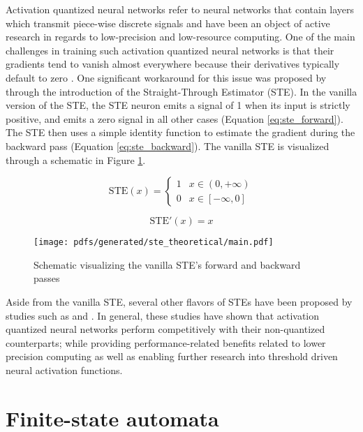 Activation quantized neural networks refer to neural networks that contain
layers which transmit piece-wise discrete signals and have been an object of
active research in regards to low-precision and low-resource computing. One of
the main challenges in training such activation quantized neural networks is
that their gradients tend to vanish almost everywhere because their derivatives
typically default to zero
\citep{bengio2013estimating,courbariaux2016binarized,yin2019understanding}. One
significant workaround for this issue was proposed by
\citet{bengio2013estimating} through the introduction of the Straight-Through
Estimator (STE). In the vanilla version of the STE, the STE neuron emits a
signal of 1 when its input is strictly positive, and emits a zero signal in all
other cases (Equation \ref{eq:ste_forward}). The STE then uses a simple identity
function to estimate the gradient during the backward pass (Equation
\ref{eq:ste_backward}). The vanilla STE is visualized through a schematic in
Figure \ref{fig:ste}.

\begin{equation}
  \label{eq:ste_forward}
  \text{STE}(x)=
  \begin{cases}
    1 & x \in (0, +\infty) \\
    0 & x \in [-\infty, 0]
  \end{cases}
\end{equation}

\begin{equation}
  \label{eq:ste_backward}
  \text{STE}'(x)= x
\end{equation}

\begin{figure}[t]
  \centering
  \texttt{[image: pdfs/generated/ste\_theoretical/main.pdf]}
  \caption{Schematic visualizing the vanilla STE's forward and backward passes}
  \label{fig:ste}
\end{figure}

Aside from the vanilla STE, several other flavors of STEs have been proposed by
studies such as \citet{courbariaux2016binarized} and
\citet{yin2019understanding}. In general, these studies have shown that
activation quantized neural networks perform competitively with their
non-quantized counterparts; while providing performance-related benefits related
to lower precision computing as well as enabling further research into threshold
driven neural activation functions.

\section{Finite-state automata}

